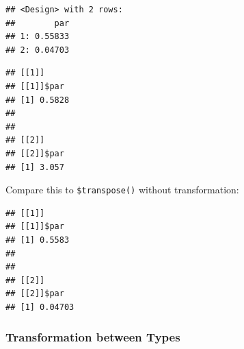 \documentclass[
]{scrbook}
\newenvironment{Shaded}{\begin{snugshade}}{\end{snugshade}}
\newcommand{\AttributeTok}[1]{\textcolor[rgb]{0.77,0.63,0.00}{#1}}
\newcommand{\CommentTok}[1]{\textcolor[rgb]{0.56,0.35,0.01}{\textit{#1}}}
\newcommand{\ConstantTok}[1]{\textcolor[rgb]{0.00,0.00,0.00}{#1}}
\newcommand{\ControlFlowTok}[1]{\textcolor[rgb]{0.13,0.29,0.53}{\textbf{#1}}}
\newcommand{\DecValTok}[1]{\textcolor[rgb]{0.00,0.00,0.81}{#1}}
\newcommand{\FunctionTok}[1]{\textcolor[rgb]{0.00,0.00,0.00}{#1}}
\newcommand{\NormalTok}[1]{#1}
\newcommand{\OtherTok}[1]{\textcolor[rgb]{0.56,0.35,0.01}{#1}}
\newcommand{\SpecialCharTok}[1]{\textcolor[rgb]{0.00,0.00,0.00}{#1}}
\newcommand{\StringTok}[1]{\textcolor[rgb]{0.31,0.60,0.02}{#1}}
\renewenvironment{Shaded} {\begin{snugshade}\small} {\end{snugshade}}
\begin{document}
\begin{Shaded}
\end{Shaded}

\begin{verbatim}
## <Design> with 2 rows:
##        par
## 1: 0.55833
## 2: 0.04703
\end{verbatim}

\begin{Shaded}
\end{Shaded}

\begin{verbatim}
## [[1]]
## [[1]]$par
## [1] 0.5828
## 
## 
## [[2]]
## [[2]]$par
## [1] 3.057
\end{verbatim}

Compare this to \texttt{\$transpose()} without transformation:

\begin{Shaded}
\end{Shaded}

\begin{verbatim}
## [[1]]
## [[1]]$par
## [1] 0.5583
## 
## 
## [[2]]
## [[2]]$par
## [1] 0.04703
\end{verbatim}

\hypertarget{transformation-between-types}{%
\subsubsection{Transformation between Types}\label{transformation-between-types}}
\end{document}
